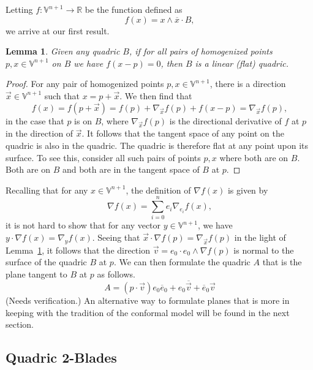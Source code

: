\documentclass{ecgd-l}
\newtheorem{lemma}[theorem]{Lemma}
\theoremstyle{definition}
\theoremstyle{remark}
\numberwithin{equation}{section}
\newcommand{\V}{\mathbb{V}}
\newcommand{\R}{\mathbb{R}}
\begin{document}
Letting $f:\V^{n+1}\to\R$ be the function defined as
\begin{equation}
f(x) = x\wedge\overline{x}\cdot B,
\end{equation}
we arrive at our first result.
\begin{lemma}\label{lma_flat_quadric}
Given any quadric $B$, if for all pairs of homogenized points $p,x\in\V^{n+1}$ on $B$
we have $f(x-p)=0$, then $B$ is a linear (flat) quadric.
\end{lemma}
\begin{proof}
For any pair of homogenized points $p,x\in\V^{n+1}$, there is a direction $\vec{x}\in\V^{n+1}$
such that $x=p+\vec{x}$.  We then find that
\begin{equation}
f(x) = f(p+\vec{x}) = f(p) + \nabla_{\vec{x}}f(p) + f(x-p) = \nabla_{\vec{x}}f(p),
\end{equation}
in the case that $p$ is on $B$, where $\nabla_{\vec{x}}f(p)$ is the directional
derivative of $f$ at $p$ in the direction of $\vec{x}$.  It follows that the tangent
space of any point on the quadric is also in the quadric.  The quadric is therefore
flat at any point upon its surface.  To see this, consider all such pairs of points $p,x$ where
both are on $B$.  Both are on $B$ and both are in the tangent space of $B$ at $p$.
\end{proof}
Recalling that for any $x\in\V^{n+1}$, the definition of $\nabla f(x)$ is given by
\begin{equation}
\nabla f(x) = \sum_{i=0}^n e_i\nabla_{e_i}f(x),
\end{equation}
it is not hard to show that for any vector $y\in\V^{n+1}$, we have
$y\cdot\nabla f(x)=\nabla_y f(x)$.  Seeing that $\vec{x}\cdot\nabla f(p)=\nabla_{\vec{x}}f(p)$
in the light of Lemma~\ref{lma_flat_quadric},
it follows that the direction $\vec{v}=e_0\cdot e_0\wedge\nabla f(p)$
is normal to the surface of the quadric $B$ at $p$.  We can then formulate
the quadric $A$ that is the plane tangent to $B$ at $p$ as follows.
\begin{equation}
A = (p\cdot\vec{v})e_0\overline{e}_0 + e_0\overline{\vec{v}}+\overline{e}_0\vec{v}
\end{equation}
(Needs verification.)
An alternative way to formulate planes that is more in keeping with the
tradition of the conformal model will be found in the next section.

\subsection{Quadric 2-Blades}
\end{document}
